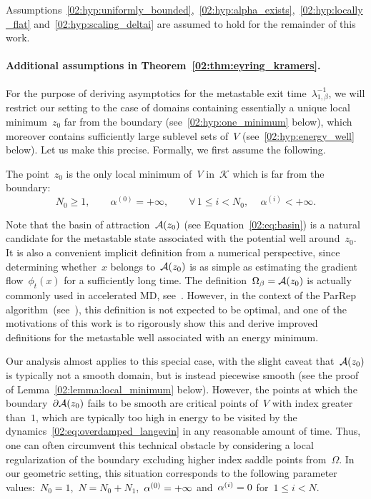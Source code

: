     Assumptions~\eqref{02:hyp:uniformly_bounded},~\eqref{02:hyp:alpha_exists},~\eqref{02:hyp:locally_flat} and~\eqref{02:hyp:scaling_deltai} are assumed to hold for the remainder of this work.
    \paragraph{Additional assumptions in Theorem~\ref{02:thm:eyring_kramers}.}
    For the purpose of deriving asymptotics for the metastable exit time~$\lambda_{1,\beta}^{-1}$, we will restrict our setting to the case of domains containing essentially a unique local minimum~$z_0$ far from the boundary (see~\eqref{02:hyp:one_minimum} below), which moreover contains sufficiently large sublevel sets of~$V$ (see~\eqref{02:hyp:energy_well} below). Let us make this precise.
    Formally, we first assume the following.
    \begin{hypothesis} 
        The point~$z_0$ is the only local minimum of~$V$ in~$\mathcal K$ which is far from the boundary: 
        \begin{equation}
            \tag{\bf EK1}
            \label{02:hyp:one_minimum}
           N_0 \geq 1,\qquad \alpha^{(0)} = +\infty,\qquad \forall\,1\leq i<N_0,\,\quad\alpha^{(i)}<+\infty.
        \end{equation}
    \end{hypothesis}
    Note that the basin of attraction~$\mathcal{A}(z_0)$ (see Equation~\eqref{02:eq:basin}) is a natural candidate for the metastable state associated with the potential well around~$z_0$.
    It is also a convenient implicit definition from a numerical perspective, since determining whether~$x$ belongs to~$\mathcal{A}(z_0)$ is as simple as estimating the gradient flow~$\phi_t(x)$ for a sufficiently long time.
    The definition~$\Omega_\beta=\mathcal{A}(z_0)$ is actually commonly used in accelerated MD, see~\cite{V98}. However, in the context of the ParRep algorithm~(see~\cite{V98}), this definition is not expected to be optimal, and one of the motivations of this work is to rigorously show this and derive improved definitions for the metastable well associated with an energy minimum.
    
    Our analysis almost applies to this special case, with the slight caveat that~$\mathcal{A}(z_0)$ is typically not a smooth domain, but is instead piecewise smooth (see the proof of Lemma~\ref{02:lemma:local_minimum} below).
    However, the points at which the boundary~$\partial\mathcal{A}(z_0)$ fails to be smooth are critical points of~$V$ with index greater than~$1$, which are typically too high in energy to be visited by the dynamics~\eqref{02:eq:overdamped_langevin} in any reasonable amount of time.
    Thus, one can often circumvent this technical obstacle by considering a local regularization of the boundary excluding higher index saddle points from~$\Omega$. In our geometric setting, this situation corresponds to the following parameter values:~$N_0=1$,~$N=N_0+N_1$,~$\alpha^{(0)}=+\infty$ and~$\alpha^{(i)}=0$ for~$1\leq i<N$.

